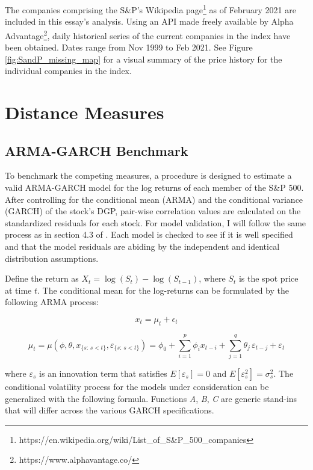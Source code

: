\documentclass[12pt]{article}
\begin{document}
The companies comprising the S\&P's Wikipedia page\footnote{https://en.wikipedia.org/wiki/List\_of\_S\&P\_500\_companies} as of February 2021 are included in this essay's analysis. Using an API made freely available by Alpha Advantage\footnote{https://www.alphavantage.co/}, daily historical series of the current companies in the index have been obtained. Dates range from Nov 1999 to Feb 2021. See Figure \ref{fig:SandP_missing_map} for a visual summary of the price history for the individual companies in the index.

\section{Distance Measures}

\subsection{ARMA-GARCH Benchmark} \label{sec:ARMAGARCH-benchmark}

To benchmark the competing measures, a procedure is designed to estimate a valid ARMA-GARCH model for the log returns of each member of the S\&P 500. After controlling for the conditional mean (ARMA) and the conditional variance (GARCH) of the stock's DGP, pair-wise correlation values are calculated on the standardized residuals for each stock. For model validation, I will follow the same process as in section 4.3 of \cite{DowiakTV-COP}. Each model is checked to see if it is well specified and that the model residuals are abiding by the independent and identical distribution assumptions.

Define the return as $X_{t} = \log \left(S_{t}\right) - \log\left(S_{t-1}\right)$, where $S_{t}$ is the spot price at time $t$. The conditional mean for the log-returns can be formulated by the following ARMA process:

\begin{equation} \label{eqn:marginalModel}
    x_{t} = \mu_{t} + \epsilon_{t}
\end{equation}

\begin{equation} \label{eq:conditional_mean}
    \mu_{t} = \mu(\phi, \theta, x_{\{s:\, s < t\}}, \varepsilon_{\{s:\, s < t\}}) = \phi_{0} + \sum_{i=1}^{p} \phi_{i} x_{t-i} + \sum_{j=1}^{q} \theta_{j} \, \varepsilon_{t - j} + \varepsilon_{t}
\end{equation}

where $\varepsilon_{s}$ is an innovation term that satisfies $E[\varepsilon_{s}] = 0$ and $E[\varepsilon^{2}_{s}] = \sigma^{2}_{s}$. The conditional volatility process for the models under consideration can be generalized with the following formula. Functions \emph{A}, \emph{B}, \emph{C} are generic stand-ins that will differ across the various GARCH specifications.
\end{document}
